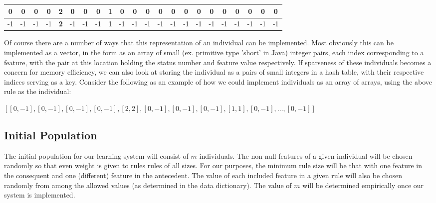\documentclass{amsart}
\theoremstyle{definition}
\theoremstyle{remark}
\numberwithin{equation}{section}
\begin{document}
\begin{center}
\begin{tabular}{ | c | c | c | c | c | c | c | c | c | c | c | c | c | c | c | c | c | c | c | c | c | c |}
 \hline
 0 & 0 & 0 & 0 & \textbf{2} & 0 & 0 & 0 & \textbf{1} & 0 & 0 & 0 & 0 & 0 & 0 & 0 & 0 & 0 & 0 & 0 & 0 & 0 \\
 \hline
 -1 & -1 & -1 & -1 & \textbf{2} & -1 & -1 & -1 & \textbf{1} & -1 & -1 & -1 & -1 & -1 & -1 & -1 & -1 & -1 & -1 & -1 & -1 & -1 \\
\hline
\end{tabular}
\end{center}
\vspace{.5cm}
Of course there are a number of ways that this representation of an individual can be implemented. Most obviously this can be implemented as a vector, in the form as an array of small (ex. primitive type 'short' in Java) integer pairs, each index corresponding to a feature, with the pair at this location holding the status number and feature value respectively. If sparseness of these individuals becomes a concern for memory efficiency, we can also look at storing the individual as a pairs of small integers in a hash table, with their respective indices serving as a key. Consider the following as an example of how we could implement individuals as an array of arrays, using the above rule as the individual:
\vspace{.5cm}
\begin{center}

$[[0,-1],[0,-1],[0,-1],[0,-1],[2,2],[0,-1],[0,-1],[0,-1],[1,1],[0,-1], \hdots,[0,-1]]$
\end{center}
\vspace{.5cm}
\subsection{Initial Population}

The initial population for our learning system will consist of $m$ individuals. The non-null features of a given individual will be chosen randomly so that even weight is given to rules rules of all sizes. For our purposes, the minimum rule size will be that with one feature in the consequent and one (different) feature in the antecedent. The value of each included feature in a given rule will also be chosen randomly from among the allowed values (as determined in the data dictionary). The value of $m$ will be determined empirically once our system is implemented. 
\end{document}
